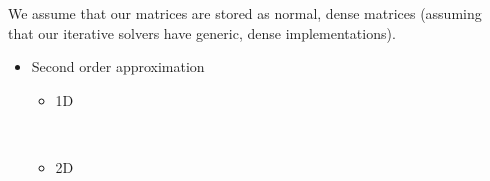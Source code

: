 \documentclass[12 pt, final]{article}
\begin{document}
\begin{itemize}
    We assume that our matrices are stored as normal, dense matrices (assuming that our iterative solvers have generic, dense implementations).
    \begin{itemize}
        \item Second order approximation
        \begin{itemize}
            \item 1D
            \begin{table}[H] %
            \\
            \end{table}   
            \item 2D


\end{itemize}
\end{itemize}
\end{itemize}
\end{document}
